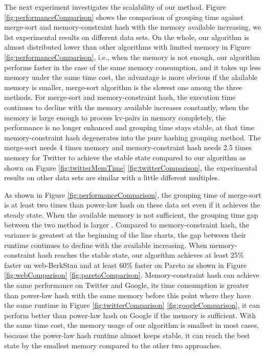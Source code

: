 The next experiment investigates the scalability of our method. Figure \ref{fig:performanceComparison} shows the comparison of grouping time against merge-sort and memory-constraint hash with the memory available increasing, we list experimental results on different data sets. 
On the whole, our algorithm is almost distributed lower than other algorithms with limited memory in Figure \ref{fig:performanceComparison}, i.e., when the memory is not enough, our algorithm performs faster in the case of the same memory consumption, and it takes up less memory under the same time cost, the advantage is more obvious if the alailable memory is smaller, merge-sort algorithm is the slowest one among the three methods. For merge-sort and memory-constraint hash, the execution time continues to decline with the memory available increases constantly, when the memory is large enough to process kv-pairs in memory completely, the performance is no longer enhanced and grouping time stays stable, at that time memory-constraint hash degenerates into the pure hashing grouping method. The merge-sort needs 4 times memory and memory-constraint hash needs 2.5 times memory for Twitter to achieve the stable state compared to our algorithm as shown on Figure \ref{fig:twitterMemTime} \ref{fig:twitterComparison}, the experimental results on other data sets are similar with a little different multiples.

As shown in Figure \ref{fig:performanceComparison}, the grouping time of merge-sort is at least two times than power-law hash on these data set even if it achieves the steady state. When the available memory is not sufficient, the grouping time gap between the two method is larger . Compared to memory-constraint hash, the variance is greatest at the beginning of the line charts, the gap between their runtime continues to decline with the available increasing. When memory-constraint hash reaches the stable state, our algorithm achieves at least 25\% faster on web-BerkStan and at least 60\% faster on Pareto as shown in Figure \ref{fig:webComparison} \ref{fig:paretoComparison}. Memory-constraint hash can achieve the same performance on Twitter and Google, its time consumption is greater than power-law hash with the same memory before this point where they have the same runtime in Figure \ref{fig:twitterComparison} \ref{fig:googleComparison}, it can perform better than power-law hash on Google if the memory is sufficient. With the same time cost, the memory usage of our algorithm is smallest in most cases, because the power-law hash runtime almost keeps stable, it can reach the best state by the smallest memory compared to the other two approaches.
   
